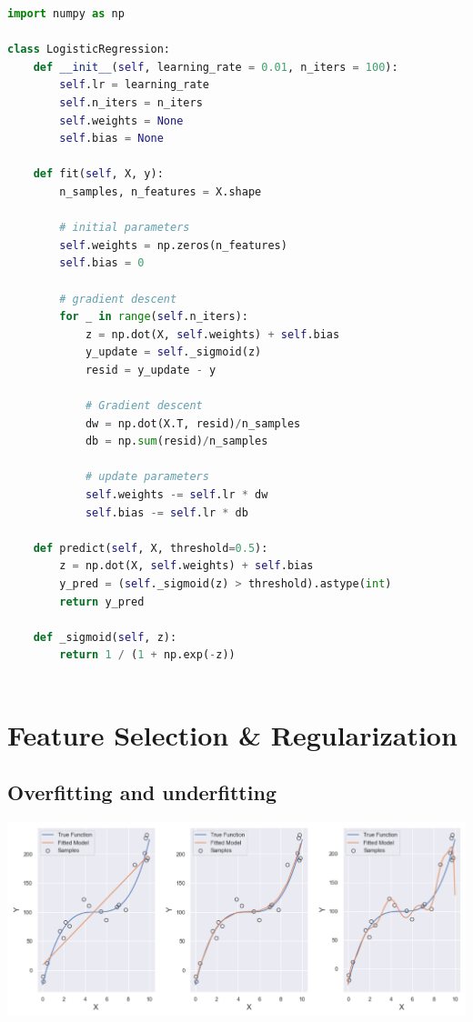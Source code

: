 \documentclass[11pt]{article}
\theoremstyle{definition}
\begin{document}
\begin{lstlisting}[language=Python]
import numpy as np

class LogisticRegression:
    def __init__(self, learning_rate = 0.01, n_iters = 100):
        self.lr = learning_rate
        self.n_iters = n_iters
        self.weights = None
        self.bias = None

    def fit(self, X, y):
        n_samples, n_features = X.shape

        # initial parameters
        self.weights = np.zeros(n_features)
        self.bias = 0

        # gradient descent
        for _ in range(self.n_iters):
            z = np.dot(X, self.weights) + self.bias
            y_update = self._sigmoid(z)
            resid = y_update - y

            # Gradient descent 
            dw = np.dot(X.T, resid)/n_samples
            db = np.sum(resid)/n_samples
            
            # update parameters
            self.weights -= self.lr * dw
            self.bias -= self.lr * db

    def predict(self, X, threshold=0.5):
        z = np.dot(X, self.weights) + self.bias
        y_pred = (self._sigmoid(z) > threshold).astype(int)
        return y_pred 
            
    def _sigmoid(self, z):
        return 1 / (1 + np.exp(-z))
        
\end{lstlisting}




\newpage
\section{Feature Selection \& Regularization}



\subsection{Overfitting and underfitting}


\includegraphics[scale=0.6]{Picture/overfit_underfit.png}
\end{document}
